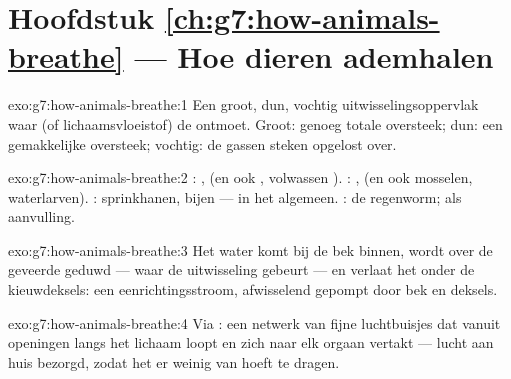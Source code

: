 \section*{Hoofdstuk \ref{ch:g7:how-animals-breathe} --- Hoe dieren ademhalen}

\begin{solution}{exo:g7:how-animals-breathe:1}
Een groot, dun, vochtig uitwisselingsoppervlak waar  (of
lichaamsvloeistof) de  ontmoet. Groot: genoeg totale oversteek;
dun: een gemakkelijke oversteek; vochtig: de gassen steken opgelost over.
\end{solution}

\begin{solution}{exo:g7:how-animals-breathe:2}
: ,  (en ook , volwassen ).
: ,  (en ook mosselen, waterlarven). :
sprinkhanen, bijen ---  in het algemeen. : de
regenworm;  als aanvulling.
\end{solution}

\begin{solution}{exo:g7:how-animals-breathe:3}
Het water komt bij de bek binnen, wordt over de geveerde  geduwd
--- waar de uitwisseling gebeurt --- en verlaat het  onder de
kieuwdeksels: een eenrichtingsstroom, afwisselend gepompt door bek en
deksels.
\end{solution}

\begin{solution}{exo:g7:how-animals-breathe:4}
Via : een netwerk van fijne luchtbuisjes dat vanuit openingen
langs het lichaam loopt en zich naar elk orgaan vertakt --- lucht aan huis
bezorgd, zodat het  er weinig van hoeft te dragen.
\end{solution}

